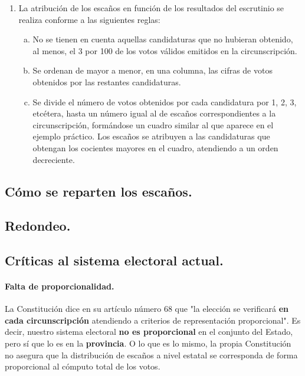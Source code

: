 \documentclass[11pt]{article}
\begin{document}
{\begin{leftbar}
		\begin{enumerate}
			\item La atribución de los escaños en función de los resultados del escrutinio se realiza conforme a las siguientes reglas:
			\begin{enumerate}[a)]
					\item No se tienen en cuenta aquellas candidaturas que no hubieran obtenido, al menos, el 3 por 100 de los votos válidos emitidos en la circunscripción.
					\item Se ordenan de mayor a menor, en una columna, las cifras de votos obtenidos por las restantes candidaturas.
					\item Se divide el número de votos obtenidos por cada candidatura por 1, 2, 3, etcétera, hasta un número igual al de escaños correspondientes a la circunscripción, formándose un cuadro similar al que aparece en el ejemplo práctico. Los escaños se atribuyen a las candidaturas que obtengan los cocientes mayores en el cuadro, atendiendo a un orden decreciente.
				\end{enumerate}
		\end{enumerate}

	\end{leftbar}
	}
	
		
	\subsection{Cómo se reparten los escaños.}
	\subsection{Redondeo.}
	\subsection{Críticas al sistema electoral actual.}
	
	\paragraph{Falta de proporcionalidad.}
	
	La Constitución dice en su artículo número 68 que "la elección se verificará \textbf{en cada circunscripción} atendiendo a criterios de representación proporcional". Es decir, nuestro sistema electoral \textbf{no es proporcional} en el conjunto del Estado, pero sí que lo es en la \textbf{provincia}. O lo que es lo mismo, la propia Constitución no asegura que la distribución de escaños a nivel estatal se corresponda de forma proporcional al cómputo total de los votos.
	
\end{document}
